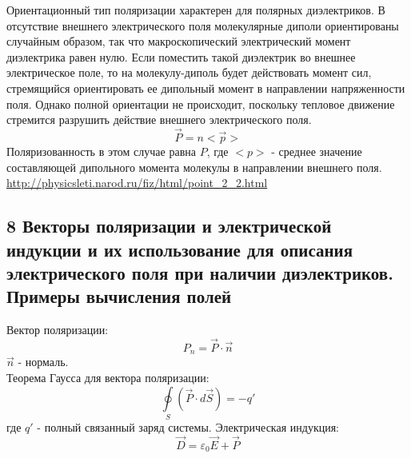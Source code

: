\documentclass[a4paper,12pt]{article}
\begin{document}
Ориентационный тип поляризации характерен для полярных диэлектриков. В отсутствие внешнего электрического поля молекулярные диполи ориентированы случайным образом, так что макроскопический электрический момент диэлектрика равен нулю. Если поместить такой диэлектрик во внешнее электрическое поле, то на молекулу-диполь будет действовать момент сил, стремящийся ориентировать ее дипольный момент в направлении напряженности поля. Однако полной ориентации не происходит, поскольку тепловое движение стремится разрушить действие внешнего электрического поля.\\
\begin{equation}
	\vec{P} = n <\vec{p}>
\end{equation}
Поляризованность в этом случае равна $P$, где $<p>$ - среднее значение составляющей дипольного момента молекулы в направлении внешнего поля.\\
\url{http://physicsleti.narod.ru/fiz/html/point_2_2.html}

\subsection{8   Векторы поляризации и электрической индукции и их использование для описания электрического поля при наличии диэлектриков. Примеры вычисления полей}
Вектор поляризации:\\
\begin{equation}
	P_n = \vec{P} \cdot \vec{n}
\end{equation}
$\vec{n}$ - нормаль.\\
Теорема Гаусса для вектора поляризации:
\begin{equation}
	\oint\limits_S {(\vec{P} \cdot d \vec{S})} = -q'
\end{equation}
где $ q' $ - полный связанный заряд системы.
Электрическая индукция:\\
\begin{equation}
	\vec{D} = \varepsilon _0 \vec{E} + \vec{P}
\end{equation}
\end{document}
